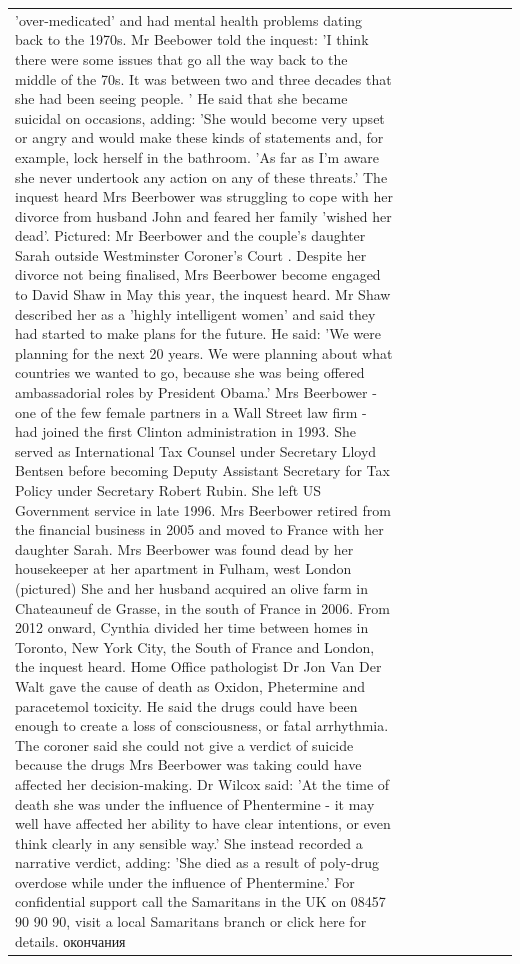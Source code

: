 \begin{table}[H]
\begin{tabular}{lllrlllll}
'over-medicated' and had mental health problems dating back to the 1970s. Mr Beebower told the inquest: 'I think there were some issues that go all the way back to the middle of the 70s. It was between two and three decades that she had been seeing people. ' He said that she became suicidal on occasions, adding: 'She would become very upset or angry and would make these kinds of statements and, for example, lock herself in the bathroom. 'As far as I'm aware she never undertook any action on any of these threats.' The inquest heard Mrs Beerbower was struggling to cope with her divorce from husband John and feared her family 'wished her dead'. Pictured: Mr Beerbower and the couple's daughter Sarah outside Westminster Coroner's Court . Despite her divorce not being finalised, Mrs Beerbower become engaged to David Shaw in May this year, the inquest heard. Mr Shaw described her as a 'highly intelligent women' and said they had started to make plans for the future. He said: 'We were planning for the next 20 years. We were planning about what countries we wanted to go, because she was being offered ambassadorial roles by President Obama.' Mrs Beerbower - one of the few female partners in a Wall Street law firm - had joined the first Clinton administration in 1993. She served as International Tax Counsel under Secretary Lloyd Bentsen before becoming Deputy Assistant Secretary for Tax Policy under Secretary Robert Rubin. She left US Government service in late 1996. Mrs Beerbower retired from the financial business in 2005 and moved to France with her daughter Sarah. Mrs Beerbower was found dead by her housekeeper at her apartment in Fulham, west London (pictured) She and her husband acquired an olive farm in Chateauneuf de Grasse, in the south of France in 2006. From 2012 onward, Cynthia divided her time between homes in Toronto, New York City, the South of France and London, the inquest heard. Home Office pathologist Dr Jon Van Der Walt gave the cause of death as Oxidon, Phetermine and paracetemol toxicity. He said the drugs could have been enough to create a loss of consciousness, or fatal arrhythmia. The coroner said she could not give a verdict of suicide because the drugs Mrs Beerbower was taking could have affected her decision-making. Dr Wilcox said: 'At the time of death she was under the influence of Phentermine - it may well have affected her ability to have clear intentions, or even think clearly in any sensible way.' She instead recorded a narrative verdict, adding: 'She died as a result of poly-drug overdose while under the influence of Phentermine.' For confidential support call the Samaritans in the UK on 08457 90 90 90, visit a local Samaritans branch or click here for details. окончания \\

\end{tabular}
\end{table}
